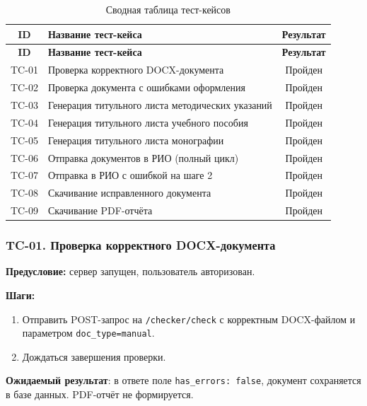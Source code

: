 \begin{xltabular}{\textwidth}{|c|p{10.5cm}|c|}
	\caption{Сводная таблица тест-кейсов\label{tab:test_cases}}\\
	\hline
	\textbf{ID} & \textbf{Название тест-кейса} & \textbf{Результат} \\
	\hline
	\endfirsthead
	
	\hline
	\textbf{ID} & \textbf{Название тест-кейса} & \textbf{Результат} \\
	\hline
	\endhead
	
	\hline
	\endfoot
	
	TC-01 & Проверка корректного DOCX-документа & Пройден \\
	\hline
	TC-02 & Проверка документа с ошибками оформления & Пройден \\
	\hline
	TC-03 & Генерация титульного листа методических указаний & Пройден \\
	\hline
	TC-04 & Генерация титульного листа учебного пособия & Пройден \\
	\hline
	TC-05 & Генерация титульного листа монографии & Пройден \\
	\hline
	TC-06 & Отправка документов в РИО (полный цикл) & Пройден \\
	\hline
	TC-07 & Отправка в РИО с ошибкой на шаге 2 & Пройден \\
	\hline
	TC-08 & Скачивание исправленного документа & Пройден \\
	\hline
	TC-09 & Скачивание PDF-отчёта & Пройден \\
	\hline
\end{xltabular}

\subsubsection{TC-01. Проверка корректного DOCX-документа}

\textbf{Предусловие:} сервер запущен, пользователь авторизован.

\textbf{Шаги:}
\begin{enumerate}
	\item Отправить POST-запрос на \texttt{/checker/check} с корректным DOCX-файлом и параметром \texttt{doc\_type=manual}.
	\item Дождаться завершения проверки.
\end{enumerate}

\textbf{Ожидаемый результат}: в ответе поле \texttt{has\_errors: false}, документ сохраняется в базе данных. PDF-отчёт не формируется.

